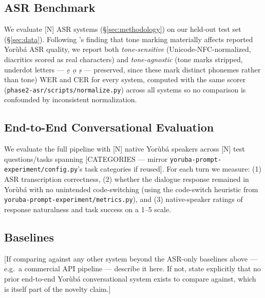 \subsection{ASR Benchmark}
We evaluate [N] ASR systems (\S\ref{sec:methodology}) on our held-out test
set (\S\ref{sec:data}). Following \citet{tone-yoruba-asr}'s finding that
tone marking materially affects reported Yor\`ub\'a ASR quality, we report
both \emph{tone-sensitive} (Unicode-NFC-normalized, diacritics scored as
real characters) and \emph{tone-agnostic} (tone marks stripped, underdot
letters --- \emph{\d{e} \d{o} \d{s}} --- preserved, since these mark distinct
phonemes rather than tone) WER and CER for every system, computed with the
same scorer (\texttt{phase2-asr/scripts/normalize.py}) across all systems
so no comparison is confounded by inconsistent normalization.

\subsection{End-to-End Conversational Evaluation}
We evaluate the full pipeline with [N] native Yor\`ub\'a speakers across
[N] test questions/tasks spanning [CATEGORIES — mirror
\texttt{yoruba-prompt-experiment/config.py}'s task categories if reused].
For each turn we measure: (1) ASR transcription correctness, (2) whether
the dialogue response remained in Yor\`ub\'a with no unintended
code-switching (using the code-switch heuristic from
\texttt{yoruba-prompt-experiment/metrics.py}), and (3) native-speaker
ratings of response naturalness and task success on a 1--5 scale.

\subsection{Baselines}
[If comparing against any other system beyond the ASR-only baselines above
— e.g.\ a commercial API pipeline — describe it here. If not, state
explicitly that no prior end-to-end Yor\`ub\'a conversational system exists
to compare against, which is itself part of the novelty claim.]
